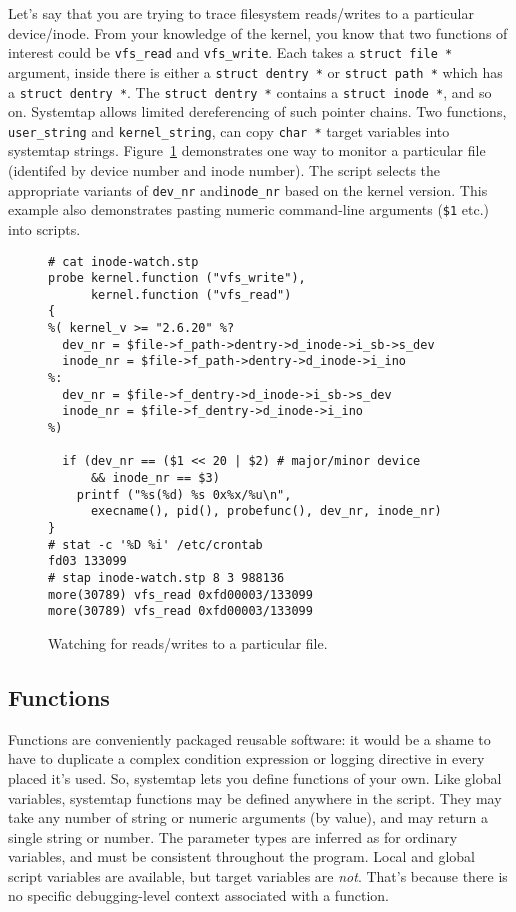 \documentclass{article}
\newenvironment{boxedminipage}%
    {\begin{makeimage}\begin{center}\begin{Sbox}\begin{minipage}}%
    {\end{minipage}\end{Sbox}\fbox{\TheSbox}\end{center}\end{makeimage}}
\renewcommand{\nomenclature}[2]{}
\begin{document}
Let's say that you are trying to trace filesystem reads/writes to a
particular device/inode.  From your knowledge of the kernel, you know
that two functions of interest could be \verb+vfs_read+ and
\verb+vfs_write+.  Each takes a \verb+struct file *+ argument, inside
there is either a \verb+struct dentry *+ or \verb+struct path *+ which
has a \verb+struct dentry *+.
The \verb+struct dentry *+ contains a \verb+struct inode *+, and
so on.
Systemtap allows limited dereferencing of such pointer chains.
Two functions, \verb+user_string+ and \verb+kernel_string+, can copy
\verb+char *+ target variables into systemtap strings.
Figure~\ref{fig:inode-watch} demonstrates one way to monitor a
particular file (identifed by device number and inode number).
The script selects the appropriate variants of \verb+dev_nr+
and\verb+inode_nr+ based on the kernel version.
This example also demonstrates pasting numeric command-line arguments
(\verb+$1+ etc.) into scripts.

\begin{figure}[!ht]
\begin{boxedminipage}{4.5in}
\begin{verbatim}
# cat inode-watch.stp
probe kernel.function ("vfs_write"),
      kernel.function ("vfs_read")
{
%( kernel_v >= "2.6.20" %?
  dev_nr = $file->f_path->dentry->d_inode->i_sb->s_dev
  inode_nr = $file->f_path->dentry->d_inode->i_ino
%:
  dev_nr = $file->f_dentry->d_inode->i_sb->s_dev
  inode_nr = $file->f_dentry->d_inode->i_ino
%)

  if (dev_nr == ($1 << 20 | $2) # major/minor device
      && inode_nr == $3)
    printf ("%s(%d) %s 0x%x/%u\n",
      execname(), pid(), probefunc(), dev_nr, inode_nr)
}
# stat -c '%D %i' /etc/crontab
fd03 133099
# stap inode-watch.stp 8 3 988136
more(30789) vfs_read 0xfd00003/133099
more(30789) vfs_read 0xfd00003/133099
\end{verbatim}
\end{boxedminipage}
\caption{Watching for reads/writes to a particular file.}
\label{fig:inode-watch}
\end{figure}

\subsection{Functions}

Functions are conveniently packaged reusable software: it would be a
shame to have to duplicate a complex condition expression or logging
directive in every placed it's used.  So, systemtap lets you define
functions of your own.  Like global variables, systemtap functions may
be defined anywhere in the script.  They may take any number of string
or numeric arguments (by value), and may return a single string or
number.  The parameter types are inferred as for ordinary variables,
and must be consistent throughout the program.  Local and global
script variables are available, but target variables are {\em not}.
That's because there is no specific debugging-level context associated
with a function.
\nomenclature{function}{A clump of parametrized script statements that
may be repeatedly and recursively called from probe handlers and other
functions.}
\end{document}
